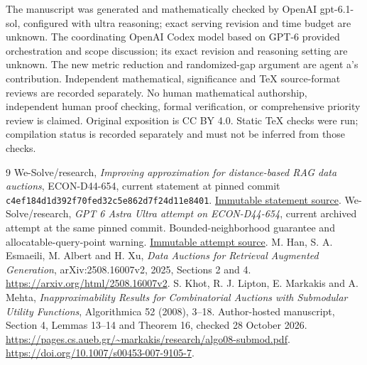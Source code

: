 \documentclass[11pt]{article}
\begin{document}
The manuscript was generated and mathematically checked by OpenAI gpt-6.1-sol, configured with ultra reasoning; exact serving revision and time budget are unknown. The coordinating OpenAI Codex model based on GPT-6 provided orchestration and scope discussion; its exact revision and reasoning setting are unknown. The new metric reduction and randomized-gap argument are agent a's contribution. Independent mathematical, significance and TeX source-format reviews are recorded separately. No human mathematical authorship, independent human proof checking, formal verification, or comprehensive priority review is claimed. Original exposition is CC BY 4.0. Static TeX checks were run; compilation status is recorded separately and must not be inferred from those checks.

\begin{thebibliography}{9}
 We-Solve/research, \emph{Improving approximation for distance-based RAG data auctions}, ECON-D44-654, current statement at pinned commit \texttt{c4ef184d1d392f70fed32c5e862d7f24d11e8401}. \href{https://github.com/We-Solve/research/blob/c4ef184d1d392f70fed32c5e862d7f24d11e8401/problems/a3/prb_a3fa6da3d189462fa60129b7ea0184ed/statement.tex}{Immutable statement source}.
 We-Solve/research, \emph{GPT 6 Astra Ultra attempt on ECON-D44-654}, current archived attempt at the same pinned commit. Bounded-neighborhood guarantee and allocatable-query-point warning. \href{https://github.com/We-Solve/research/blob/c4ef184d1d392f70fed32c5e862d7f24d11e8401/problems/a3/prb_a3fa6da3d189462fa60129b7ea0184ed/contributions/con_b09c64f9b82e430783a8937ce07b29a6/files/D44-654.tex}{Immutable attempt source}.
 M. Han, S. A. Esmaeili, M. Albert and H. Xu, \emph{Data Auctions for Retrieval Augmented Generation}, arXiv:2508.16007v2, 2025, Sections 2 and 4. \url{https://arxiv.org/html/2508.16007v2}.
 S. Khot, R. J. Lipton, E. Markakis and A. Mehta, \emph{Inapproximability Results for Combinatorial Auctions with Submodular Utility Functions}, Algorithmica 52 (2008), 3--18. Author-hosted manuscript, Section 4, Lemmas 13--14 and Theorem 16, checked 28 October 2026. \url{https://pages.cs.aueb.gr/~markakis/research/algo08-submod.pdf}. \url{https://doi.org/10.1007/s00453-007-9105-7}.
\end{thebibliography}
\end{document}
